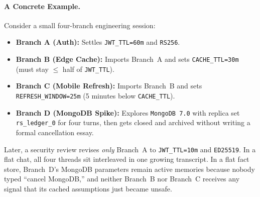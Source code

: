 \documentclass[10pt,twocolumn]{article}
\begin{document}
\paragraph{A Concrete Example.}
Consider a small four-branch engineering session:
\begin{itemize}
  \item \textbf{Branch A (Auth):} Settles \texttt{JWT\_TTL=60m} and \texttt{RS256}.
  \item \textbf{Branch B (Edge Cache):} Imports Branch~A and sets \texttt{CACHE\_TTL=30m} (must stay $\le$ half of \texttt{JWT\_TTL}).
  \item \textbf{Branch C (Mobile Refresh):} Imports Branch~B and sets \texttt{REFRESH\_WINDOW=25m} (5 minutes below \texttt{CACHE\_TTL}).
  \item \textbf{Branch D (MongoDB Spike):} Explores \texttt{MongoDB 7.0} with replica set \texttt{rs\_ledger\_0} for four turns, then gets closed and archived without writing a formal cancellation essay.
\end{itemize}
Later, a security review revises \emph{only} Branch~A to \texttt{JWT\_TTL=10m} and \texttt{ED25519}. In a flat chat, all four threads sit interleaved in one growing transcript. In a flat fact store, Branch~D's MongoDB parameters remain active memories because nobody typed ``cancel MongoDB,'' and neither Branch~B nor Branch~C receives any signal that its cached assumptions just became unsafe.
\end{document}
